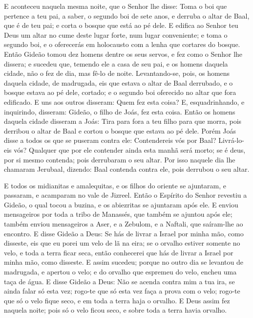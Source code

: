 E aconteceu naquela mesma noite, que o Senhor lhe disse: Toma o
boi que pertence a teu pai, a saber, o segundo boi de sete anos, e
derruba o altar de Baal, que é de teu pai; e corta o bosque que está
ao pé dele. E edifica ao Senhor teu Deus um altar no cume
deste lugar forte, num lugar conveniente; e toma o segundo boi, e o
oferecerás em holocausto com a lenha que cortares do bosque.
Então Gideão tomou dez homens dentre os seus servos, e fez
como o Senhor lhe dissera; e sucedeu que, temendo ele a casa de seu
pai, e os homens daquela cidade, não o fez de dia, mas fê-lo de
noite. Levantando-se, pois, os homens daquela cidade, de
madrugada, eis que estava o altar de Baal derrubado, e o bosque
estava ao pé dele, cortado; e o segundo boi oferecido no altar que
fora edificado. E uns aos outros disseram: Quem fez esta
coisa? E, esquadrinhando, e inquirindo, disseram: Gideão, o filho de
Joás, fez esta coisa. Então os homens daquela cidade disseram
a Joás: Tira para fora a teu filho para que morra, pois derribou o
altar de Baal e cortou o bosque que estava ao pé dele. Porém
Joás disse a todos os que se puseram contra ele: Contendereis vós
por Baal? Livrá-lo-eis vós? Qualquer que por ele contender ainda
esta manhã será morto; se é deus, por si mesmo contenda; pois
derrubaram o seu altar. Por isso naquele dia lhe chamaram
Jerubaal, dizendo: Baal contenda contra ele, pois derrubou o seu
altar.

E todos os midianitas e amalequitas, e os filhos do oriente se
ajuntaram, e passaram, e acamparam no vale de Jizreel. Então
o Espírito do Senhor revestiu a Gideão, o qual tocou a buzina, e os
abiezritas se ajuntaram após ele. E enviou mensageiros por
toda a tribo de Manassés, que também se ajuntou após ele; também
enviou mensageiros a Aser, e a Zebulom, e a Naftali, que saíram-lhe
ao encontro. E disse Gideão a Deus: Se hás de livrar a Israel
por minha mão, como disseste, eis que eu porei um velo de lã
na eira; se o orvalho estiver somente no velo, e toda a terra ficar
seca, então conhecerei que hás de livrar a Israel por minha mão,
como disseste. E assim sucedeu; porque no outro dia se
levantou de madrugada, e apertou o velo; e do orvalho que espremeu
do velo, encheu uma taça de água. E disse Gideão a Deus: Não
se acenda contra mim a tua ira, se ainda falar só esta vez; rogo-te
que só esta vez faça a prova com o velo; rogo-te que só o velo fique
seco, e em toda a terra haja o orvalho. E Deus assim fez
naquela noite; pois só o velo ficou seco, e sobre toda a terra havia
orvalho.

\medskip

